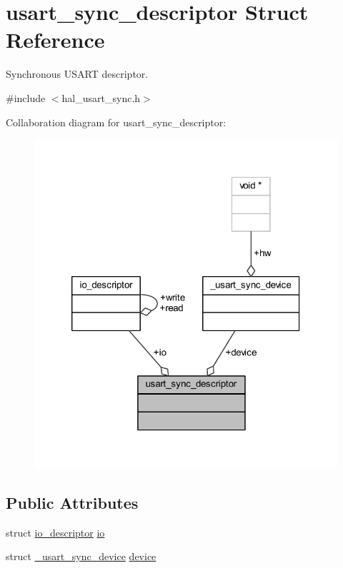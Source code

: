 \hypertarget{structusart__sync__descriptor}{}\section{usart\+\_\+sync\+\_\+descriptor Struct Reference}
\label{structusart__sync__descriptor}


Synchronous U\+S\+A\+RT descriptor.  




{\ttfamily \#include $<$hal\+\_\+usart\+\_\+sync.\+h$>$}



Collaboration diagram for usart\+\_\+sync\+\_\+descriptor\+:
\nopagebreak
\begin{figure}[H]
\begin{center}
\leavevmode
\includegraphics[width=320pt]{structusart__sync__descriptor__coll__graph}
\end{center}
\end{figure}
\subsection*{Public Attributes}
\begin{DoxyCompactItemize}
\item 
struct \hyperlink{structio__descriptor}{io\+\_\+descriptor} \hyperlink{structusart__sync__descriptor_a9ef5dd1d1c2010fc961d3e803c7429cb}{io}
\item 
struct \hyperlink{struct__usart__sync__device}{\+\_\+usart\+\_\+sync\+\_\+device} \hyperlink{structusart__sync__descriptor_a825cfcdd7f23413952a2a198b8a07ad5}{device}
\end{DoxyCompactItemize}


